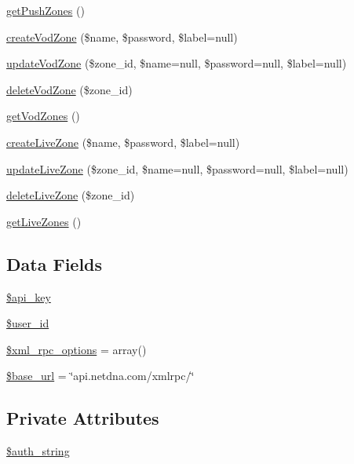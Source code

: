 \begin{DoxyCompactItemize}
\hyperlink{class_max_c_d_n_a16b0ec27cb42588cc908b1fa1fb5dc3b}{getPushZones} ()
\item 
\hyperlink{class_max_c_d_n_aa692957f148655dfb52b57856752cb1a}{createVodZone} (\$name, \$password, \$label=null)
\item 
\hyperlink{class_max_c_d_n_a9dbe6ee3e3316947a53c7449b5058cdb}{updateVodZone} (\$zone\_\-id, \$name=null, \$password=null, \$label=null)
\item 
\hyperlink{class_max_c_d_n_a44ef0c0f3348b3823a827d4f8fd1f69b}{deleteVodZone} (\$zone\_\-id)
\item 
\hyperlink{class_max_c_d_n_a252e5eb5e92bda7e596ef52038156db8}{getVodZones} ()
\item 
\hyperlink{class_max_c_d_n_a541ec1657aca049f04e53517f95d8bf6}{createLiveZone} (\$name, \$password, \$label=null)
\item 
\hyperlink{class_max_c_d_n_a887cf925e7b0137f584f75c0ea253a64}{updateLiveZone} (\$zone\_\-id, \$name=null, \$password=null, \$label=null)
\item 
\hyperlink{class_max_c_d_n_a4a95c42a3716d9f45be0cbe37db33ff9}{deleteLiveZone} (\$zone\_\-id)
\item 
\hyperlink{class_max_c_d_n_a1492bb1d403e0e37bbb6694ceade7431}{getLiveZones} ()
\end{DoxyCompactItemize}
\subsection*{Data Fields}
\begin{DoxyCompactItemize}
\item 
\hyperlink{class_max_c_d_n_a186dfe06d14a3bc248c4eb4bcdaec562}{\$api\_\-key}
\item 
\hyperlink{class_max_c_d_n_af0fcd925f00973e32f7214859dfb3c6b}{\$user\_\-id}
\item 
\hyperlink{class_max_c_d_n_aa9300810e8d9adff7d3fdc176c218363}{\$xml\_\-rpc\_\-options} = array()
\item 
\hyperlink{class_max_c_d_n_a6886427c9c643f707fcb35c018049bc7}{\$base\_\-url} = \char`\"{}api.netdna.com/xmlrpc/\char`\"{}
\end{DoxyCompactItemize}
\subsection*{Private Attributes}
\begin{DoxyCompactItemize}
\item 
\hyperlink{class_max_c_d_n_a3538f42031d718c9e5de4b6cd8b7789e}{\$auth\_\-string}
\end{DoxyCompactItemize}


